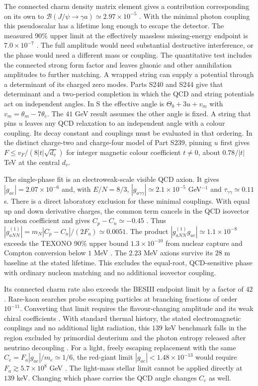 \documentclass[aps,prd,reprint,onecolumn,nofootinbib,amsmath,amssymb]{revtex4-2}
\begin{document}
The connected charm density matrix element gives a contribution corresponding on its own to $\mathcal B(J/\psi\to\gamma a)\simeq2.97\times10^{-5}$ \cite{HPQCD2025Axion}. With the minimal photon coupling this pseudoscalar has a lifetime long enough to escape the detector. The measured 90\% upper limit at the effectively massless missing-energy endpoint is $7.0\times10^{-7}$ \cite{BESIII2020Invisible}. The full amplitude would need substantial destructive interference, or the phase would need a different mass or coupling. The quantitative test includes the connected strong form factor and leaves gluonic and other annihilation amplitudes to further matching. A wrapped string can supply a potential through a determinant of its charged zero modes. Parts S240 and S244 give that determinant and a two-period completion in which the QCD and string potentials act on independent angles. In S the effective angle is $\Theta_0+3u+v_m$ with $v_m=\theta_m-7\theta_e$. The $41$ GeV result assumes the other angle is fixed. A string that pins $u$ leaves any QCD relaxation to an independent angle with a colour coupling. Its decay constant and couplings must be evaluated in that ordering. In the distinct charge-two and charge-four model of Part S239, pinning $u$ first gives $F\le v_F/(8|t|\sqrt{d_v})$ for integer magnetic colour coefficient $t\ne0$, about $0.78/|t|$ TeV at the central $d_v$.

The single-phase fit is an electroweak-scale visible QCD axion. It gives $|g_{ae}|=2.07\times10^{-6}$ and, with $E/N=8/3$, $|g_{a\gamma\gamma}|\simeq2.1\times10^{-5}$ GeV$^{-1}$ and $\tau_{\gamma\gamma}\simeq0.11$ s. There is a direct laboratory exclusion for these minimal couplings. With equal up and down derivative charges, the common term cancels in the QCD isovector nucleon coefficient and gives $C_p-C_n\simeq-0.45$ \cite{Grilli2016Axion}. Thus $|g_{aNN}^{(1)}|=m_N|C_p-C_n|/(2F_a)\simeq0.0051$. The product $|g_{aNN}^{(1)}g_{ae}|\simeq1.1\times10^{-8}$ exceeds the TEXONO 90\% upper bound $1.3\times10^{-10}$ from nuclear capture and Compton conversion below $1$ MeV \cite{TEXONO2007Axions}. The $2.23$ MeV axions survive its $28$ m baseline at the stated lifetime. This excludes the equal-root, QCD-sensitive phase with ordinary nucleon matching and no additional isovector coupling.

Its connected charm rate also exceeds the BESIII endpoint limit by a factor of $42$. Rare-kaon searches probe escaping particles at branching fractions of order $10^{-11}$. Converting that limit requires the flavour-changing amplitude and its weak chiral coefficients \cite{NA622025Hidden,Cornella2024Kaon}. With standard thermal history, the stated electromagnetic couplings and no additional light radiation, this $139$ keV benchmark falls in the region excluded by primordial deuterium and the photon entropy released after neutrino decoupling \cite{Cadamuro2011Axion,Millea2015Axion}. For a light, freely escaping replacement with the same $C_e=F_a|g_{ae}|/m_e\simeq1/6$, the red-giant limit $|g_{ae}|<1.48\times10^{-13}$ would require $F_a\gtrsim5.7\times10^8$ GeV \cite{Straniero2020Giants}. The light-mass stellar limit cannot be applied directly at $139$ keV. Changing which phase carries the QCD angle changes $C_e$ as well.
\end{document}
